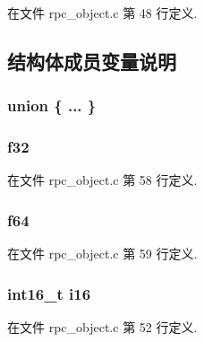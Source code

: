 在文件 rpc\+\_\+object.\+c 第 48 行定义.



\subsection{结构体成员变量说明}
\hypertarget{struct__krpc__number__t_aa29e1c80820b08d322eca6e2a0177467}{}\subsubsection[{"@1}]{\setlength{\rightskip}{0pt plus 5cm}union \{ ... \} }\label{struct__krpc__number__t_aa29e1c80820b08d322eca6e2a0177467}
\hypertarget{struct__krpc__number__t_a3001b93aa674f41b1b6e0eb71e940a06}{}
\subsubsection[{f32}]{ f32}\label{struct__krpc__number__t_a3001b93aa674f41b1b6e0eb71e940a06}


在文件 rpc\+\_\+object.\+c 第 58 行定义.

\hypertarget{struct__krpc__number__t_a6853d50b869df7e2912d8cae40536018}{}
\subsubsection[{f64}]{ f64}\label{struct__krpc__number__t_a6853d50b869df7e2912d8cae40536018}


在文件 rpc\+\_\+object.\+c 第 59 行定义.

\hypertarget{struct__krpc__number__t_a13de5fed4ebbb0a83478255f1900009f}{}
\subsubsection[{i16}]{\setlength{\rightskip}{0pt plus 5cm}int16\+\_\+t i16}\label{struct__krpc__number__t_a13de5fed4ebbb0a83478255f1900009f}


在文件 rpc\+\_\+object.\+c 第 52 行定义.

